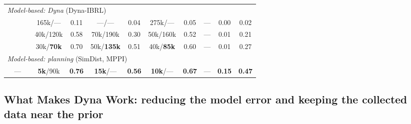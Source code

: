\documentclass{article} %
\newcommand{\CMSCALE}{0.85}
\newcommand{\NOSCALE}{0.78}
\newcommand{\yes}{\scalebox{\CMSCALE}{\ding{51}}}
\newcommand{\no}{\textcolor{black!35}{\scalebox{\NOSCALE}{\ding{55}}}}
\newcommand{\na}{\textcolor{black!35}{---}}
\begin{document}
\begin{table}[t]
{\begin{tabular}{ccc cc cc cc cc c}
\midrule
\multicolumn{12}{l}{\emph{Model-based: Dyna} (Dyna-IBRL)}\\
\yes & \no & \no
  & 165k/--- & 0.11 & ---/--- & 0.04 & 275k/--- & 0.05 & --- & 0.00 & 0.02 \\
\yes & \yes & \no
  & 40k/120k & 0.58 & 70k/190k & 0.30 & 50k/160k & 0.52 & --- & 0.01 & 0.21 \\
\yes & \yes & \yes
  & 30k/\textbf{70k} & 0.70 & 50k/\textbf{135k} & 0.51 & 40k/\textbf{85k} & 0.60 & --- & 0.01 & 0.27 \\
\midrule
\multicolumn{12}{l}{\emph{Model-based: planning} (SimDist, MPPI)}\\
\yes & \na & \no
  & \textbf{5k}/90k & \textbf{0.76} & \textbf{15k}/--- & \textbf{0.56} & \textbf{10k}/--- & \textbf{0.67} & --- & \textbf{0.15} & \textbf{0.47} \\
\bottomrule
\end{tabular}}
\end{table}


\subsection{What Makes Dyna Work: reducing the model error and keeping the collected data near the prior}
\label{sec:two-conditions}
\end{document}
